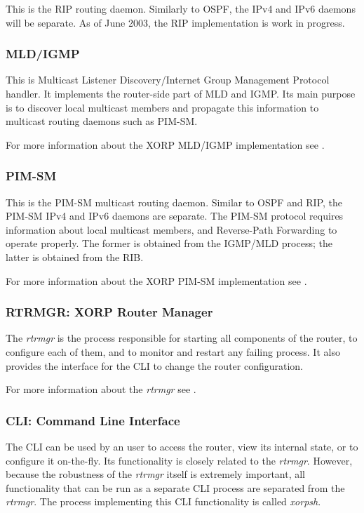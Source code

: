 \documentclass[11pt]{article}
\begin{document}
This is the RIP routing daemon. Similarly to OSPF, the IPv4 and IPv6
daemons will be separate.
As of June 2003, the RIP implementation is work in progress.

\subsubsection{MLD/IGMP}

This is Multicast Listener Discovery/Internet Group Management Protocol
handler. It implements the router-side part of MLD and IGMP. Its main
purpose is to discover local multicast members and propagate this
information to multicast routing daemons such as PIM-SM.

For more information about the XORP MLD/IGMP implementation see
\cite{xorp:mld_igmp}.

\subsubsection{PIM-SM}

This is the PIM-SM multicast routing daemon. Similar to OSPF and RIP,
the PIM-SM IPv4 and IPv6 daemons are separate. The PIM-SM protocol requires
information about local multicast members, and Reverse-Path Forwarding
to operate properly. The former is obtained from the IGMP/MLD process;
the latter is obtained from the RIB.

For more information about the XORP PIM-SM implementation see
\cite{xorp:pim}.

\subsubsection{RTRMGR: XORP Router Manager}

The {\em rtrmgr} is the process responsible for starting all components of
the router, to configure each of them, and to monitor and restart any
failing process.  It also provides the interface for the CLI to change
the router configuration.

For more information about the {\em rtrmgr} see
\cite{xorp:rtrmgr}.

\subsubsection{CLI: Command Line Interface}

The CLI can be used by an user to access the router, view
its internal state, or to configure it on-the-fly. Its functionality
is closely related to the {\em rtrmgr}. However, because the robustness of
the {\em rtrmgr} itself is extremely important, all functionality that can
be run as a separate CLI process are separated from the {\em rtrmgr}.  The
process implementing this CLI functionality is called {\em xorpsh}.
\end{document}
